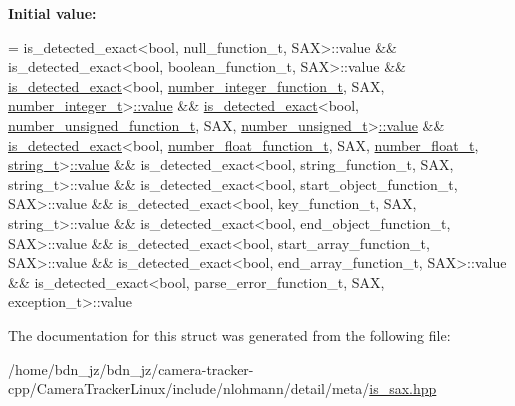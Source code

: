 {\bfseries Initial value\+:}
\begin{DoxyCode}
=
        is\_detected\_exact<bool, null\_function\_t, SAX>::value &&
        is\_detected\_exact<bool, boolean\_function\_t, SAX>::value &&
        \hyperlink{namespacenlohmann_1_1detail_a7542b4dbac07817fd4849ecfa4619def}{is\_detected\_exact}<bool, \hyperlink{namespacenlohmann_1_1detail_a4a3e14a011b9ea1ff849fc6d2411e6a0}{number\_integer\_function\_t}, SAX,
        \hyperlink{structnlohmann_1_1detail_1_1is__sax_aa9a29390ca9810cee149510f586f5573}{number\_integer\_t}>\hyperlink{structnlohmann_1_1detail_1_1is__sax_a8ab7e51087000e948b4a2492257484dc}{::value} &&
        \hyperlink{namespacenlohmann_1_1detail_a7542b4dbac07817fd4849ecfa4619def}{is\_detected\_exact}<bool, \hyperlink{namespacenlohmann_1_1detail_a74da7b17bda76f65d276feb18209c913}{number\_unsigned\_function\_t}, SAX,
        \hyperlink{structnlohmann_1_1detail_1_1is__sax_a655c9b8038e51e5b9211e2419118644d}{number\_unsigned\_t}>\hyperlink{structnlohmann_1_1detail_1_1is__sax_a8ab7e51087000e948b4a2492257484dc}{::value} &&
        \hyperlink{namespacenlohmann_1_1detail_a7542b4dbac07817fd4849ecfa4619def}{is\_detected\_exact}<bool, \hyperlink{namespacenlohmann_1_1detail_ad42df56e913abe26ed556e0e92f386f4}{number\_float\_function\_t}, SAX, 
      \hyperlink{structnlohmann_1_1detail_1_1is__sax_a58d3205c8d3c7a01cc330374fa7976c5}{number\_float\_t},
        \hyperlink{structnlohmann_1_1detail_1_1is__sax_ad8e2e1427ff43536370b6db6ab83ae50}{string\_t}>\hyperlink{structnlohmann_1_1detail_1_1is__sax_a8ab7e51087000e948b4a2492257484dc}{::value} &&
        is\_detected\_exact<bool, string\_function\_t, SAX, string\_t>::value &&
        is\_detected\_exact<bool, start\_object\_function\_t, SAX>::value &&
        is\_detected\_exact<bool, key\_function\_t, SAX, string\_t>::value &&
        is\_detected\_exact<bool, end\_object\_function\_t, SAX>::value &&
        is\_detected\_exact<bool, start\_array\_function\_t, SAX>::value &&
        is\_detected\_exact<bool, end\_array\_function\_t, SAX>::value &&
        is\_detected\_exact<bool, parse\_error\_function\_t, SAX, exception\_t>::value
\end{DoxyCode}


The documentation for this struct was generated from the following file\+:\begin{DoxyCompactItemize}
\item 
/home/bdn\+\_\+jz/bdn\+\_\+jz/camera-\/tracker-\/cpp/\+Camera\+Tracker\+Linux/include/nlohmann/detail/meta/\hyperlink{is__sax_8hpp}{is\+\_\+sax.\+hpp}\end{DoxyCompactItemize}
